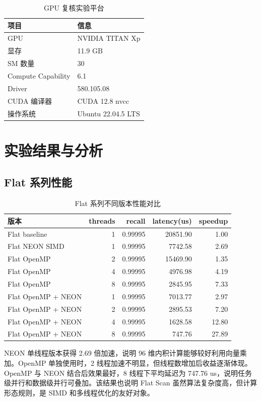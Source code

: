 \documentclass[UTF8,a4paper,10pt]{ctexart}
\begin{document}
\begin{table}[H]
\centering
\caption{GPU 复核实验平台}
\label{tab:gpu_platform}
\begin{tabular}{ll}
\toprule
项目 & 信息 \\
\midrule
GPU & NVIDIA TITAN Xp \\
显存 & 11.9 GB \\
SM 数量 & 30 \\
Compute Capability & 6.1 \\
Driver & 580.105.08 \\
CUDA 编译器 & CUDA 12.8 nvcc \\
操作系统 & Ubuntu 22.04.5 LTS \\
\bottomrule
\end{tabular}
\end{table}

\section{实验结果与分析}

\subsection{Flat 系列性能}

\begin{table}[H]
\centering
\caption{Flat 系列不同版本性能对比}
\label{tab:flat_results}
\begin{tabular}{lrrrr}
\toprule
版本 & threads & recall & latency(us) & speedup \\
\midrule
Flat baseline & 1 & 0.99995 & 20851.90 & 1.00 \\
Flat NEON SIMD & 1 & 0.99995 & 7742.58 & 2.69 \\
Flat OpenMP & 2 & 0.99995 & 15469.90 & 1.35 \\
Flat OpenMP & 4 & 0.99995 & 4976.98 & 4.19 \\
Flat OpenMP & 8 & 0.99995 & 2845.95 & 7.33 \\
Flat OpenMP + NEON & 1 & 0.99995 & 7013.77 & 2.97 \\
Flat OpenMP + NEON & 2 & 0.99995 & 2895.53 & 7.20 \\
Flat OpenMP + NEON & 4 & 0.99995 & 1628.58 & 12.80 \\
Flat OpenMP + NEON & 8 & 0.99995 & 747.76 & 27.89 \\
\bottomrule
\end{tabular}
\end{table}

NEON 单线程版本获得 2.69 倍加速，说明 96 维内积计算能够较好利用向量乘加。OpenMP 单独使用时，2 线程加速不明显，但线程数增加后收益逐渐体现。OpenMP 与 NEON 结合后效果最好，8 线程下平均延迟为 747.76 us，说明任务级并行和数据级并行可叠加。该结果也说明 Flat Scan 虽然算法复杂度高，但计算形态规则，是 SIMD 和多线程优化的友好对象。
\end{document}
